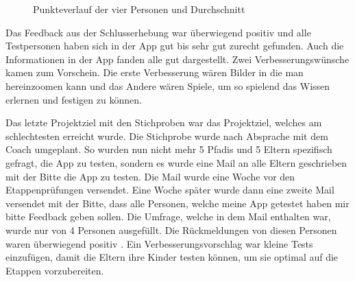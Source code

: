 \begin{figure}[ht]
    \centering
    \caption{Punkteverlauf der vier Personen und Durchschnitt}
    \label{fig:fortschritt}
\end{figure}

Das Feedback aus der Schlusserhebung war überwiegend positiv und alle Testpersonen haben sich in der App gut bis sehr gut zurecht gefunden. Auch die Informationen in der App fanden alle gut dargestellt. Zwei Verbesserungswünsche kamen zum Vorschein. Die erste Verbesserung wären Bilder in die man hereinzoomen kann und das Andere wären Spiele, um so spielend das Wissen erlernen und festigen zu können. \par
Das letzte Projektziel mit den Stichproben war das Projektziel, welches am schlechtesten erreicht wurde. Die Stichprobe wurde nach Absprache mit dem Coach umgeplant. So wurden nun nicht mehr 5 Pfadis und 5 Eltern spezifisch gefragt, die App zu testen, sondern es wurde eine Mail an alle Eltern geschrieben mit der Bitte die App zu testen. Die Mail wurde eine Woche vor den Etappenprüfungen versendet. Eine Woche später wurde dann eine zweite Mail versendet mit der Bitte, dass alle Personen, welche meine App getestet haben mir bitte Feedback geben sollen. Die Umfrage, welche in dem Mail enthalten war, wurde nur von 4 Personen ausgefüllt. Die Rückmeldungen von diesen Personen waren überwiegend positiv \cite{noauthor_feedback_nodate}. Ein Verbesserungsvorschlag war kleine Tests einzufügen, damit die Eltern ihre Kinder testen können, um sie optimal auf die Etappen vorzubereiten.

